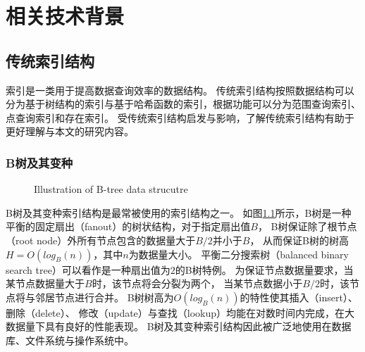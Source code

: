 \chapter{相关技术背景}
\label{chap:back}

\section{传统索引结构}

索引是一类用于提高数据查询效率的数据结构。
传统索引结构按照数据结构可以分为基于树结构的索引与基于哈希函数的索引，根据功能可以分为范围查询索引、点查询索引和存在索引。
{\li}受传统索引结构启发与影响，了解传统索引结构有助于更好理解{\li}与本文的研究内容。

\subsection{B树及其变种}

\begin{figure}[!htp]
  \centering
    {Illustration of B-tree data strucutre}
  \label{fig:btree}
\end{figure}

B树及其变种索引结构是最常被使用的索引结构之一\cite{graefe2001b}。
如图\ref{fig:btree}所示，B树是一种平衡的固定扇出（fanout）的树状结构，对于指定扇出值$B$，
B树保证除了根节点（root node）外所有节点包含的数据量大于$B/2$并小于$B$，
从而保证B树的树高$H=O(log_B(n))$，其中$n$为数据量大小。
平衡二分搜索树（balanced binary search tree）可以看作是一种扇出值为$2$的B树特例。
为保证节点数据量要求，当某节点数据量大于$B$时，该节点将会分裂为两个，
当某节点数据小于$B/2$时，该节点将与邻居节点进行合并。
B树树高为$O(log_B(n))$的特性使其插入（insert）、删除（delete）、
修改（update）与查找（lookup）均能在对数时间内完成，在大数据量下具有良好的性能表现。
B树及其变种索引结构因此被广泛地使用在数据库、文件系统与操作系统中。


